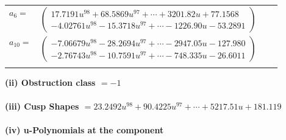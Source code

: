 \documentclass[1p]{elsarticle_modified}
\theoremstyle{definition}
\begin{document}
\begin{tabular}{m{7pt} m{180pt} m{7pt} m{180pt} }
\flushright $a_{6}=$&$\begin{pmatrix}17.7191 u^{98}+68.5869 u^{97}+\cdots+3201.82 u+77.1568\\-4.02761 u^{98}-15.3718 u^{97}+\cdots-1226.90 u-53.2891\end{pmatrix}$ \\
\flushright $a_{10}=$&$\begin{pmatrix}-7.06679 u^{98}-28.2694 u^{97}+\cdots-2947.05 u-127.980\\-2.76743 u^{98}-10.7591 u^{97}+\cdots-748.335 u-26.6011\end{pmatrix}$\\&\end{tabular}
\flushleft \textbf{(ii) Obstruction class $= -1$}\\~\\
\flushleft \textbf{(iii) Cusp Shapes $= 23.2492 u^{98}+90.4225 u^{97}+\cdots+5217.51 u+181.119$}\\~\\
\newpage\renewcommand{\arraystretch}{1}
\flushleft \textbf{(iv) u-Polynomials at the component}\newline \\
\end{document}
